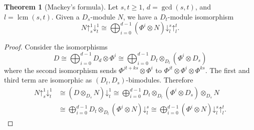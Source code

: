 \documentclass[11pt,reqno]{amsart}
\theoremstyle{definition}
\newtheorem{theorem}{Theorem}[section]
\DeclareMathOperator{\lcm}{lcm}
\newcommand{\pda}{\mathord{\downarrow}}
\newcommand{\pua}{\mathord{\uparrow}}
\begin{document}
\begin{theorem}[Mackey's formula]
\label{thm:mackey-formula}
    Let $s,t\ge 1$, $d=\gcd(s,t)$, and $l=\lcm(s,t)$. Given a $D_s$-module $N$, we have a $D_t$-module isomorphism
    \begin{equation}\label{eq:mackey}
        N\pua^{1}_{s}\pda^{1}_{t}
        \cong 
        \bigoplus_{i=0}^{d-1} 
        \left( 
        \Phi^{i}\otimes N
        \right)\pda^{s}_{l}\pua^{t}_{l}.
    \end{equation}
\end{theorem}
\begin{proof}
    Consider the isomorphisms
    \[
        D\cong \bigoplus_{i=0}^{d-1} D_{d}\otimes \Phi^{i}
        \cong \bigoplus_{i=0}^{d-1} D_{t}\otimes_{D_{l}}(\Phi^{i}\otimes D_{s})
    \]
    where the second isomorphism sends $\Phi^{jt+ks}\otimes \Phi^{i}$ to $\Phi^{jt}\otimes \Phi^{i}\otimes \Phi^{ks}$. 
    The first and third term are isomorphic as $(D_{t},D_{s})$-bimodules.
    Therefore
    \begin{equation*}
        \begin{split}
            N\pua^{1}_{s}\pda^{1}_{t} 
            & \cong \left(D\otimes_{D_{s}}N\right)\pda^{1}_{t}
            \cong \bigoplus_{i=0}^{d-1} D_{t}\otimes_{D_{l}}\left(\Phi^{i}\otimes D_{s}\right)\otimes_{D_{s}}N\\
            & \cong \bigoplus_{i=0}^{d-1} D_{t}\otimes_{D_{l}}\left(\Phi^{i}\otimes N\right)\pda^{s}_{l}
            \cong \bigoplus_{i=0}^{d-1} 
            \left(\Phi^{i}\otimes N\right)\pda^{s}_{l}\pua^{t}_{l}.
        \end{split}
    \end{equation*}
\end{proof}
\end{document}
